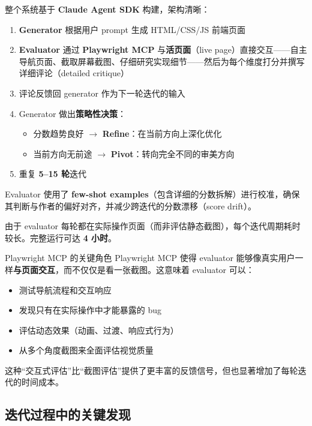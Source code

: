 \documentclass[a4paper]{article}
\begin{document}
整个系统基于 \textbf{Claude Agent SDK} 构建，架构清晰：

\begin{enumerate}[leftmargin=1.5em]
    \item \textbf{Generator} 根据用户 prompt 生成 HTML/CSS/JS 前端页面
    \item \textbf{Evaluator} 通过 \textbf{Playwright MCP} 与\textbf{活页面}（live page）直接交互——自主导航页面、截取屏幕截图、仔细研究实现细节——然后为每个维度打分并撰写详细评论（detailed critique）
    \item 评论反馈回 generator 作为下一轮迭代的输入
    \item Generator 做出\textbf{策略性决策}：
    \begin{itemize}[leftmargin=1em]
        \item 分数趋势良好 $\to$ \textbf{Refine}：在当前方向上深化优化
        \item 当前方向无前途 $\to$ \textbf{Pivot}：转向完全不同的审美方向
    \end{itemize}
    \item 重复 \textbf{5--15 轮}迭代
\end{enumerate}

Evaluator 使用了 \textbf{few-shot examples}（包含详细的分数拆解）进行校准，确保其判断与作者的偏好对齐，并减少跨迭代的分数漂移（score drift）。

由于 evaluator 每轮都在实际操作页面（而非评估静态截图），每个迭代周期耗时较长。完整运行可达 \textbf{4 小时}。

\begin{knowledgebox}{Playwright MCP 的关键角色}
Playwright MCP 使得 evaluator 能够像真实用户一样\textbf{与页面交互}，而不仅仅是看一张截图。这意味着 evaluator 可以：
\begin{itemize}[leftmargin=1.5em]
    \item 测试导航流程和交互响应
    \item 发现只有在实际操作中才能暴露的 bug
    \item 评估动态效果（动画、过渡、响应式行为）
    \item 从多个角度截图来全面评估视觉质量
\end{itemize}
这种``交互式评估''比``截图评估''提供了更丰富的反馈信号，但也显著增加了每轮迭代的时间成本。
\end{knowledgebox}

\subsection{迭代过程中的关键发现}
\end{document}
